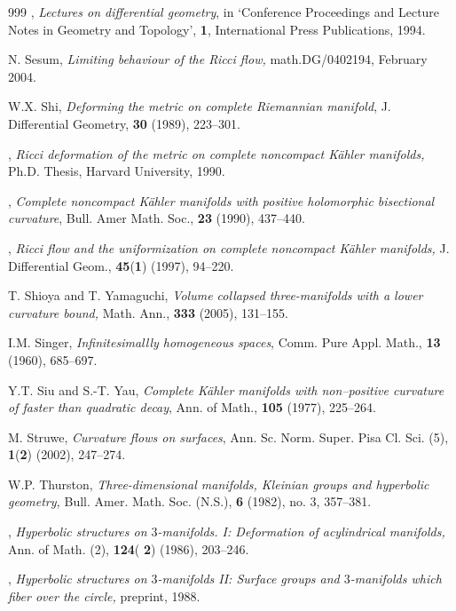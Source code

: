 \begin{thebibliography}{999}
 \bysame,
{\it Lectures on differential geometry}, in `Conference
Proceedings and Lecture Notes in Geometry and Topology', {\bf 1},
International Press Publications, 1994.

 N. Sesum,
{\it Limiting behaviour of the Ricci flow,} math.DG/0402194,
February 2004.

 W.X.  Shi,
{\it Deforming the metric on complete Riemannian manifold}, J.
Differential Geometry,  {\bf 30} (1989), 223--301.

 \bysame,
{\it Ricci deformation of the metric on complete noncompact
K\"{a}hler manifolds,} Ph.D. Thesis, Harvard University, 1990.

  \bysame,
{\it Complete noncompact K\"ahler manifolds with positive
holomorphic bisectional curvature}, Bull. Amer Math. Soc., {\bf
23} (1990), 437--440.

 \bysame,
{\it Ricci flow and the uniformization on complete noncompact
K\"{a}hler manifolds,} J. Differential Geom., \textbf{45}({\bf 1})
(1997), 94--220.

 T. Shioya and T. Yamaguchi,
{\it Volume collapsed three-manifolds with a lower curvature
bound,} Math. Ann., \textbf{333} (2005), 131--155.

 I.M. Singer,
{\it Infinitesimallly homogeneous spaces}, Comm. Pure Appl. Math.,
\textbf{13} (1960), 685--697.

 Y.T. Siu and S.-T. Yau,
{\it Complete K\"ahler manifolds with non--positive curvature of
faster than quadratic decay}, Ann. of Math., {\bf 105} (1977),
225--264.

 M. Struwe,
{\it Curvature flows on surfaces}, Ann. Sc. Norm. Super. Pisa Cl.
Sci. (5), \textbf{1}({\bf 2}) (2002), 247--274.

 W.P. Thurston,
{\it Three-dimensional manifolds,
 Kleinian groups and hyperbolic geometry,} Bull. Amer. Math. Soc. (N.S.),
 \textbf{6} (1982), no. 3, 357--381.

 \bysame,
{\it Hyperbolic structures on $3$-manifolds. {\rm I:} Deformation
of acylindrical manifolds,} Ann. of Math. (2), \textbf{124}({\bf
2}) (1986), 203--246.

 \bysame,
{\it Hyperbolic structures on $3$-manifolds {\rm II:} Surface
groups and $3$-manifolds which fiber over the circle,} preprint,
1988.


\end{thebibliography}
